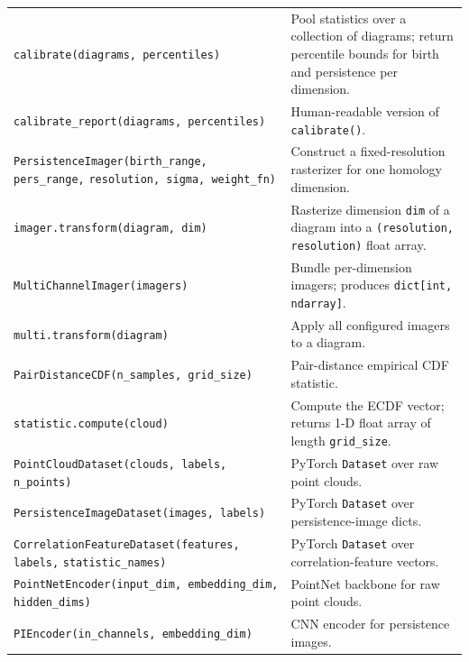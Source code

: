 \documentclass[11pt, a4paper]{article}
\newcommand{\code}[1]{\texttt{#1}}
\begin{document}
\begin{longtable}{p{5.6cm} p{9.5cm}}
\code{calibrate(diagrams, percentiles)} &
  Pool statistics over a collection of diagrams; return percentile bounds
  for birth and persistence per dimension. \\[4pt]

\code{calibrate\_report(diagrams, percentiles)} &
  Human-readable version of \code{calibrate()}. \\[4pt]

\code{PersistenceImager(birth\_range, pers\_range,} \code{resolution, sigma, weight\_fn)} &
  Construct a fixed-resolution rasterizer for one homology dimension. \\[4pt]

\code{imager.transform(diagram, dim)} &
  Rasterize dimension \code{dim} of a diagram into a
  \code{(resolution, resolution)} float array. \\[4pt]

\code{MultiChannelImager(imagers)} &
  Bundle per-dimension imagers; produces \code{dict[int, ndarray]}. \\[4pt]

\code{multi.transform(diagram)} &
  Apply all configured imagers to a diagram. \\[4pt]

\code{PairDistanceCDF(n\_samples, grid\_size)} &
  Pair-distance empirical CDF statistic. \\[4pt]

\code{statistic.compute(cloud)} &
  Compute the ECDF vector; returns 1-D float array of length
  \code{grid\_size}. \\[4pt]

\code{PointCloudDataset(clouds, labels, n\_points)} &
  PyTorch \code{Dataset} over raw point clouds. \\[4pt]

\code{PersistenceImageDataset(images, labels)} &
  PyTorch \code{Dataset} over persistence-image dicts. \\[4pt]

\code{CorrelationFeatureDataset(features, labels,} \code{statistic\_names)} &
  PyTorch \code{Dataset} over correlation-feature vectors. \\[4pt]

\code{PointNetEncoder(input\_dim, embedding\_dim,} \code{hidden\_dims)} &
  PointNet backbone for raw point clouds. \\[4pt]

\code{PIEncoder(in\_channels, embedding\_dim)} &
  CNN encoder for persistence images. \\[4pt]


\end{longtable}
\end{document}
